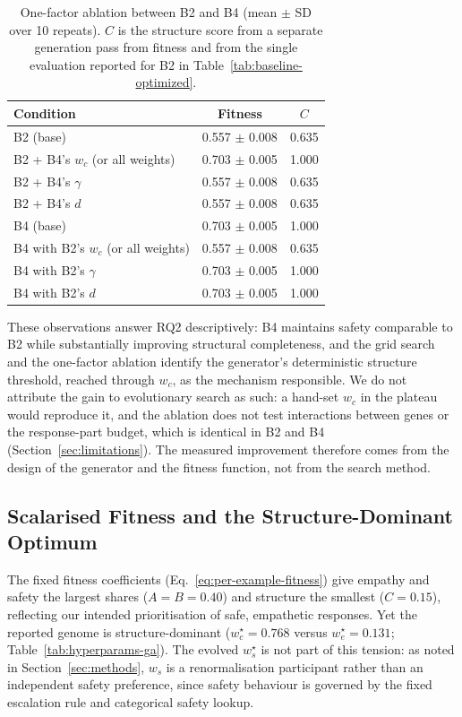 \documentclass[mathematics,article,submit,xetex,moreauthors]{Definitions/mdpi}
\begin{document}
\begin{table}[H]
\centering
\small
\caption{One-factor ablation between B2 and B4 (mean $\pm$ SD over 10 repeats). $C$ is the structure score from a separate generation pass from fitness and from the single evaluation reported for B2 in Table~\ref{tab:baseline-optimized}.}
\label{tab:ablation}
\begin{tabular}{lcc}
\toprule
Condition & Fitness & $C$ \\
\midrule
B2 (base) & 0.557 $\pm$ 0.008 & 0.635 \\
B2 + B4's $w_c$ (or all weights) & 0.703 $\pm$ 0.005 & 1.000 \\
B2 + B4's $\gamma$ & 0.557 $\pm$ 0.008 & 0.635 \\
B2 + B4's $d$ & 0.557 $\pm$ 0.008 & 0.635 \\
\midrule
B4 (base) & 0.703 $\pm$ 0.005 & 1.000 \\
B4 with B2's $w_c$ (or all weights) & 0.557 $\pm$ 0.008 & 0.635 \\
B4 with B2's $\gamma$ & 0.703 $\pm$ 0.005 & 1.000 \\
B4 with B2's $d$ & 0.703 $\pm$ 0.005 & 1.000 \\
\bottomrule
\end{tabular}
\end{table}

These observations answer RQ2 descriptively: B4 maintains safety comparable
to B2 while substantially improving structural completeness, and the grid
search and the one-factor ablation identify the generator's deterministic
structure threshold, reached through $w_c$, as the mechanism responsible. We
do not attribute the gain to evolutionary search as such: a hand-set $w_c$ in
the plateau would reproduce it, and the ablation does not test interactions
between genes or the response-part budget, which is identical in B2 and B4
(Section~\ref{sec:limitations}). The measured improvement therefore comes from the design of the generator and
the fitness function, not from the search method.

\subsection{Scalarised Fitness and the Structure-Dominant Optimum}
\label{sec:balance-discussion}

The fixed fitness coefficients (Eq.~\eqref{eq:per-example-fitness}) give
empathy and safety the largest shares ($A=B=0.40$) and structure the smallest
($C=0.15$), reflecting our intended prioritisation of safe, empathetic
responses. Yet the reported genome is structure-dominant
($w_c^{\star}=0.768$ versus $w_e^{\star}=0.131$;
Table~\ref{tab:hyperparams-ga}). The evolved $w_s^{\star}$ is not part of this
tension: as noted in Section~\ref{sec:methods}, $w_s$ is a renormalisation
participant rather than an independent safety preference, since safety
behaviour is governed by the fixed escalation rule and categorical safety
lookup.
\end{document}
